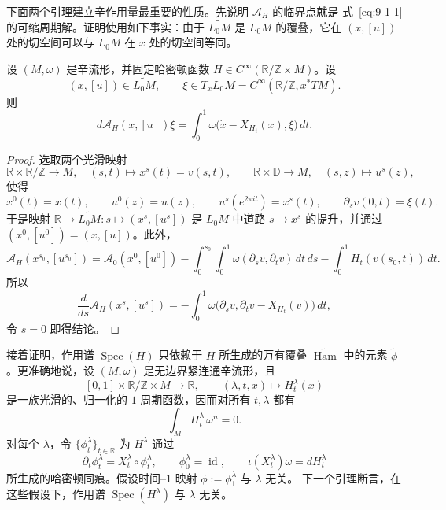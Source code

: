 下面两个引理建立辛作用量最重要的性质。先说明 $\mathcal A_H$ 的临界点就是
式~\eqref{eq:9-1-1} 的可缩周期解。证明使用如下事实：由于 $\widetilde{L_0M}$ 是
$L_0M$ 的覆叠，它在 $(x,[u])$ 处的切空间可以与 $L_0M$ 在 $x$ 处的切空间等同。

\begin{lemma}\label{lem:9-1-8}
设 $(M,\omega)$ 是辛流形，并固定哈密顿函数
$H\in C^\infty(\mathbb R/\mathbb Z\times M)$。设
\[
  (x,[u])\in\widetilde{L_0M},
  \qquad
  \xi\in T_xL_0M=C^\infty(\mathbb R/\mathbb Z,x^*TM).
\]
则
\[
  d\mathcal A_H(x,[u])\xi
  =\int_0^1\omega\bigl(\dot x-X_{H_t}(x),\xi\bigr)\,dt.
\]
\end{lemma}

\begin{proof}
选取两个光滑映射
\[
  \mathbb R\times\mathbb R/\mathbb Z\longrightarrow M,
  \quad (s,t)\longmapsto x^s(t)=v(s,t),
  \qquad
  \mathbb R\times\mathbb D\longrightarrow M,
  \quad (s,z)\longmapsto u^s(z),
\]
使得
\[
  x^0(t)=x(t),\qquad u^0(z)=u(z),\qquad
  u^s(e^{2\pi it})=x^s(t),\qquad \partial_sv(0,t)=\xi(t).
\]
于是映射
$\mathbb R\to\widetilde{L_0M}:s\mapsto(x^s,[u^s])$ 是 $L_0M$ 中道路
$s\mapsto x^s$ 的提升，并通过 $(x^0,[u^0])=(x,[u])$。此外，
\[
  \mathcal A_H(x^{s_0},[u^{s_0}])
  =\mathcal A_0(x^0,[u^0])
  -\int_0^{s_0}\int_0^1\omega(\partial_sv,\partial_tv)\,dt\,ds
  -\int_0^1H_t(v(s_0,t))\,dt.
\]
所以
\[
  \frac d{ds}\mathcal A_H(x^s,[u^s])
  =-\int_0^1\omega\bigl(\partial_sv,\partial_tv-X_{H_t}(v)\bigr)\,dt,
\]
令 $s=0$ 即得结论。
\end{proof}

接着证明，作用谱 $\operatorname{Spec}(H)$ 只依赖于 $H$ 所生成的万有覆叠
$\widetilde{\operatorname{Ham}}$ 中的元素 $\widetilde\phi$。更准确地说，设
$(M,\omega)$ 是无边界紧连通辛流形，且
\[
  [0,1]\times\mathbb R/\mathbb Z\times M\longrightarrow\mathbb R,
  \qquad (\lambda,t,x)\longmapsto H_t^\lambda(x)
\]
是一族光滑的、归一化的 $1$-周期函数，因而对所有 $t,\lambda$ 都有
\begin{equation}\label{eq:9-1-10}
  \int_MH_t^\lambda\,\omega^n=0.
\end{equation}
对每个 $\lambda$，令 $\{\phi_t^\lambda\}_{t\in\mathbb R}$ 为 $H^\lambda$ 通过
\[
  \partial_t\phi_t^\lambda=X_t^\lambda\circ\phi_t^\lambda,
  \qquad \phi_0^\lambda=\operatorname{id},
  \qquad \iota(X_t^\lambda)\omega=dH_t^\lambda
\]
所生成的哈密顿同痕。假设时间--$1$ 映射 $\phi:=\phi_1^\lambda$ 与 $\lambda$ 无关。
下一个引理断言，在这些假设下，作用谱 $\operatorname{Spec}(H^\lambda)$ 与 $\lambda$
无关。

